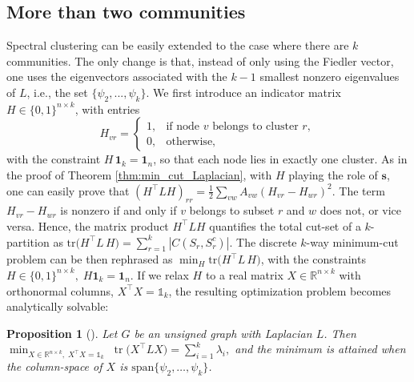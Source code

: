 \documentclass[reprint,onecolumn]{article}
\newtheorem{proposition}[theorem]{Proposition}
\newcommand{\R}{\mathbb{R}}
\newcommand{\1}{\mathbb{1}}
\newcommand{\0}{\mathbf{0}}
\DeclareMathOperator\tr{tr}
\begin{document}
\subsection{More than two communities}   
Spectral clustering can be easily extended to the case where there are $k$ communities. The only change is that, instead of only using the Fiedler vector, one uses the eigenvectors associated with the $k-1$ smallest nonzero eigenvalues of $L$, i.e., the set $\{\psi_2,...,\psi_k\}$. We first introduce an indicator matrix $H\in\{0,1\}^{n\times k}$, with entries
\[
H_{vr} = 
\begin{cases}
1,&\text{if node }v\text{ belongs to cluster }r,\\
0,&\text{otherwise},
\end{cases}
\]
with the constraint $H\,\mathbf{1}_k =\mathbf{1}_n$, so that each node lies in exactly one cluster. As in the proof of Theorem \ref{thm:min_cut_Laplacian}, with $H$ playing the role of $\mathbf{s}$, one can easily prove that $(H^\top L H)_{rr}=\frac12 \sum_{vw}A_{vw}(H_{vr}-H_{wr})^2$. The term $H_{vr}-H_{wr}$ is nonzero if and only if $v$ belongs to subset $r$ and $w$ does not, or vice versa. Hence, the matrix product $H^\top L H$ quantifies the total cut-set of a $k$-partition as
\(
\mathrm{tr}\bigl(H^\top L\,H\bigr) = \sum_{r=1}^k |C(S_r,S_r^c)|.
\)
The discrete \(k\)-way minimum-cut problem can be then rephrased as
\(
\min_{H}
\mathrm{tr}\bigl(H^\top L\,H\bigr)
\), with the constraints $H\in\{0,1\}^{n\times k},\;H\mathbf{1}_k=\mathbf{1}_n$. If we relax \(H\) to a real matrix \(X\in\R^{n\times k}\) with orthonormal columns, \(X^\top X = \1_k\), the resulting optimization problem becomes analytically solvable:

\begin{proposition}[\cite{horn2012matrix}]\label{prop:multi_k_spectal_clustering}
Let $G$ be an unsigned graph with Laplacian \(L\).  Then
\(
\min_{X\in\mathbb{R}^{n\times k},\;X^\top X = \1_k}
\;\tr\!\bigl(X^\top L X\bigr)
=\sum_{i=1}^k\lambda_i,
\)
and the minimum is attained when the column-space of \(X\)
is \(\mathrm{span}\{\psi_2,\dots,\psi_k\}\).
\end{proposition}
\end{document}

